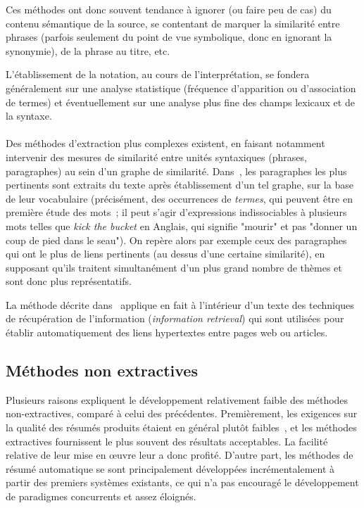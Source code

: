 \documentclass{article}           %
\begin{document}
Ces méthodes ont donc souvent tendance à ignorer (ou faire peu de cas) du contenu sémantique de la source, se contentant de marquer la similarité entre phrases (parfois seulement du point de vue symbolique, donc en ignorant la synonymie), de la phrase au titre, etc.

L'établissement de la notation, au cours de l'interprétation, se fondera généralement sur une analyse statistique (fréquence d'apparition ou d'association de termes) et éventuellement sur une analyse plus fine des champs lexicaux et de la syntaxe.

\paragraph{}
Des méthodes d'extraction plus complexes existent, en faisant notamment intervenir des mesures de similarité entre unités syntaxiques (phrases, paragraphes) au sein d'un graphe de similarité. Dans~\cite{salton_automatic_1997}, les paragraphes les plus pertinents sont extraits du texte après établissement d'un tel graphe, sur la base de leur vocabulaire (précisément, des occurrences de \emph{termes}, qui peuvent être en première étude des mots~; il peut s'agir d'expressions indissociables à plusieurs mots telles que \textit{kick the bucket} en Anglais, qui signifie "mourir" et pas "donner un coup de pied dans le seau"). On repère alors par exemple ceux des paragraphes qui ont le plus de liens pertinents (au dessus d'une certaine similarité), en supposant qu'ils traitent simultanément d'un plus grand nombre de thèmes et sont donc plus représentatifs.

La méthode décrite dans~\cite{salton_automatic_1997} applique en fait à l'intérieur d'un texte des techniques de récupération  de l'information (\emph{information retrieval}) qui sont utilisées pour établir automatiquement des liens hypertextes entre pages web ou articles.


\subsection{Méthodes non extractives}

Plusieurs raisons expliquent le développement relativement faible des méthodes non-extractives, comparé à celui des précédentes. Premièrement, les exigences sur la qualité des résumés produits étaient en général plutôt faibles~\cite{jones_automatic_2007}, et les méthodes extractives fournissent le plus souvent des résultats acceptables. La facilité relative de leur mise en œuvre leur a donc profité. D'autre part, les méthodes de résumé automatique se sont principalement développées incrémentalement à partir des premiers systèmes existants, ce qui n'a pas encouragé le développement de paradigmes concurrents et assez éloignés.
\end{document}
